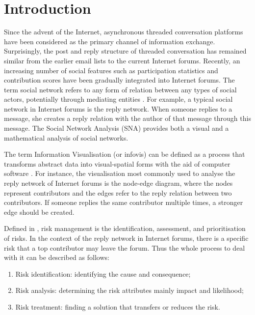 \chapter{Introduction} \label{Chapter:Introduction}

Since the advent of the Internet, asynchronous threaded conversation platforms have been considered as the primary channel of information exchange. Surprisingly, the post and reply structure of threaded conversation has remained similar from the earlier email lists to the current Internet forums. Recently, an increasing number of social features such as participation statistics and contribution scores have been gradually integrated into Internet forums. The term social network refers to any form of relation between any types of social actors, potentially through mediating entities \citep{Brandes2008a}. For example, a typical social network in Internet forums is the reply network. When someone replies to a message, she creates a reply relation with the author of that message through this message. The Social Network Analysis (SNA) provides both a visual and a mathematical analysis of social networks.

The term Information Visualisation (or infovis) can be defined as a process that transforms abstract data into visual-spatial forms with the aid of computer software \citep{Card1999}. For instance, the visualisation most commonly used to analyse the reply network of Internet forums is the node-edge diagram, where the nodes represent contributors and the edges refer to the reply relation between two contributors. If someone replies the same contributor multiple times, a stronger edge should be created.

Defined in \citep{IS2009}, risk management is the identification, assessment, and prioritisation of risks. In the context of the reply network in Internet forums, there is a specific risk that a top contributor may leave the forum. Thus the whole process to deal with it can be described as follows:
\begin{enumerate}
	\item Risk identification: identifying the cause and consequence;\\
	\item Risk analysis: determining the risk attributes mainly impact and likelihood;\\
	\item Risk treatment: finding a solution that transfers or reduces the risk.
\end{enumerate}


